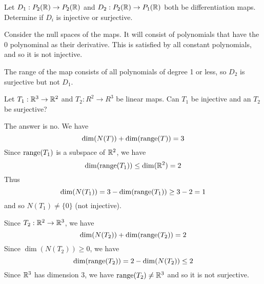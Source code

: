 \documentclass{article}
\begin{document}
\begin{example}
  Let $D_1: P_2(\mathbb{R}) \to P_2(\mathbb{R})$ and $D_2: P_2(\mathbb{R}) \to P_1(\mathbb{R})$ both be differentiation maps. Determine if $D_i$ is injective or surjective.

  Consider the null spaces of the maps. It will consist of polynomials that have the $0$ polynominal as their derivative. This is satisfied by all constant polynomials, and so it is not injective.

  The range of the map consists of all polynomials of degree 1 or less, so $D_2$ is surjective but not $D_1$.
\end{example}
\begin{example}
  Let $T_1: \mathbb{R}^3 \to \mathbb{R}^2$ and $T_2: R^2 \to R^3$ be linear maps. Can $T_1$ be injective and an $T_2$ be surjective?

  The answer is no. We have \[
    \dim(N(T)) + \dim(\operatorname{\text{range}}(T)) = 3
  \]
  Since $\operatorname{\text{range}}(T_1)$ is a subspace of $\mathbb{R}^2$, we have \[
    \dim(\operatorname{\text{range}}(T_1)) \leq \dim(\mathbb{R}^2) = 2
  \]
  Thus \[
    \dim(N(T_1)) = 3 - \dim(\operatorname{\text{range}}(T_1)) \geq 3 - 2 =1
  \] and so $N(T_1) \neq \{0\}$ (not injective).

  Since $T_2: \mathbb{R}^2 \to \mathbb{R}^3$, we have \[
    \dim(N(T_2)) + \dim(\operatorname{\text{range}}(T_2)) = 2
  \]
  Since $\dim(N(T_2)) \geq 0$, we have \[
    \dim(\operatorname{\text{range}}(T_2)) = 2 - \dim(N(T_2)) \leq 2
  \]
  Since $\mathbb{R}^3$ has dimension $3$, we have $\operatorname{\text{range}}(T_2) \neq \mathbb{R}^3$ and so it is not surjective.
\end{example}
\end{document}
